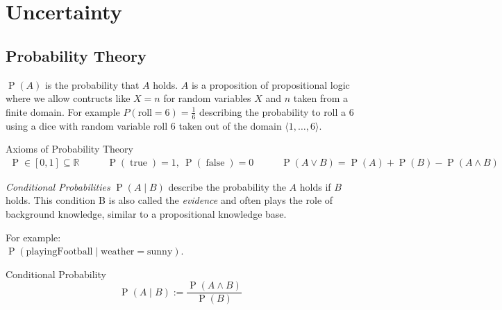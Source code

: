 \documentclass[english]{panikzettel}
\begin{document}
\newpage
\section{Uncertainty}
\subsection{Probability Theory}
$\operatorname{P}(A)$ is the probability that $A$ holds. $A$ is a proposition of propositional logic where we allow contructs like $X=n$ for random variables $X$ and $n$ taken from a finite domain. For example $P(\text{roll}=6) = \frac{1}{6}$ describing the probability to roll a 6 using a dice with random variable roll $6$ taken out of the domain $\langle 1,\dots,6\rangle$.

\begin{defi}{Axioms of Probability Theory}
\small
\[ \begin{array}{lcr}
    \operatorname{P} \in [0,1] \subseteq \mathbb{R}\qquad & \operatorname{P}(\operatorname{true}) = 1,~ \operatorname{P}(\operatorname{false}) = 0 & \qquad\operatorname{P}(A \lor B) = \operatorname{P}(A) + \operatorname{P}(B) - \operatorname{P}(A \land B)
\end{array} \]
\end{defi}
\medskip

\begin{halfboxl}
\emph{Conditional Probabilities} $\operatorname{P} (A\mid B)$ describe the probability the $A$ holds if $B$ holds. This condition B is also called the \emph{evidence} and often plays the role of background knowledge, similar to a propositional knowledge base.

For example: \\
$\operatorname{P} (\text{playingFootball} \mid \text{weather}=\text{sunny})$.
\end{halfboxl}%
\begin{halfboxr}
\vspace{-\baselineskip}
\begin{defi}{Conditional Probability}
\[\operatorname P (A \mid B) := \frac{\operatorname{P}(A\land B)}{\operatorname{P} (B)}\]
\end{defi}
\end{halfboxr}
\medskip
\end{document}
